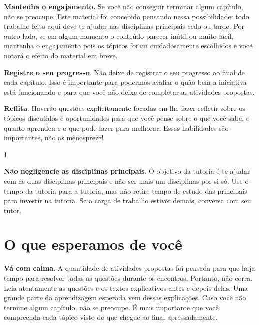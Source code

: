 \documentclass[10pt,openany,twoside=semi]{book}
\newcommand{\paraAmbos}{%
	\def\destinacaoConteudo{\kParaAmbos}
	\ifnum\strcmp{\versaoApostila}{tutor}=0
		\color{black}
		\setmainfont{Spectral}
		\leftskip=0pt
	\fi
}
\theoremstyle{estiloQuestao}
\theoremstyle{estiloQuestao}
\theoremstyle{estiloQuestao}
\theoremstyle{plain}
\theoremstyle{estiloSetinha}
\theoremstyle{estiloSetinha}
\theoremstyle{estiloSetinha}
\theoremstyle{estiloSetinha}
\newcommand{\notaTutor}[1]{ }
\newcommand{\notaTutor}[1]{
 	\hspace{0pt}\marginpar{
 		\scriptsize
 		\linespread{1.654} 
 		\ArchivoMediumEight
 		#1}}
\begin{document}
\notaTutor{Mas, ao invés de respostas prontas, 
$$ 1 = x^2 $$
procure sugestões ou esclarecimentos que lhe permitam resolver as questões e entender os conceitos de maneira independente.}\textbf{Mantenha o engajamento.} Se você não conseguir terminar algum capítulo, não se preocupe. Este material foi concebido pensando nessa possibilidade: todo trabalho feito aqui deve te ajudar nas disciplinas principais cedo ou tarde. Por outro lado, se em algum momento o conteúdo parecer inútil ou muito fácil, mantenha o engajamento pois os tópicos foram cuidadosamente escolhidos e vocẽ notará o efeito do material em breve.

\textbf{Registre o seu progresso}. Não deixe de registrar o seu progresso ao final de cada capítulo. Isso é importante para podermos avaliar o quão bem a iniciativa está funcionando e para que você não deixe de completar as atividades propostas.

\textbf{Reflita}. Haverão questões explicitamente focadas em lhe fazer refletir sobre os tópicos discutidos e oportunidades para que você pense sobre o que você sabe, o quanto aprendeu e o que pode fazer para melhorar. Essas habilidades são importantes, não as menospreze! 

1                                                            \tab 


\textbf{Não negligencie as disciplinas principais}. O objetivo da tutoria é te ajudar com as duas disciplinas principais e não ser mais um disciplinas por si só. Use o tempo da tutoria para a tutoria, mas não retire tempo de estudo das principais para investir na tutoria. Se a carga de trabalho estiver demais, conversa com seu tutor.


\section{O que esperamos de você}

\textbf{Vá com calma}. A quantidade de atividades propostas foi pensada para que haja tempo para resolver todas as questões durante os encontros. Portanto, não corra. Leia atentamente as questões e os textos explicativos antes e depois delas. Uma grande parte da aprendizagem esperada vem dessas explicações. Caso você não termine algum capítulo, não se preocupe. É mais importante que você compreenda cada tópico visto do que chegue ao final apressadamente.
 
\end{document}
